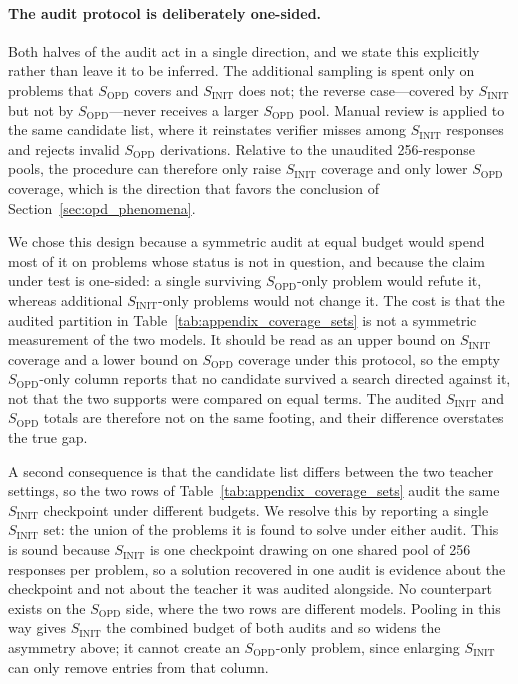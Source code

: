 \paragraph{The audit protocol is deliberately one-sided.}
Both halves of the audit act in a single direction, and we state this
explicitly rather than leave it to be inferred. The additional sampling is
spent only on problems that $S_{\mathrm{OPD}}$ covers and $S_{\mathrm{INIT}}$
does not; the reverse case---covered by $S_{\mathrm{INIT}}$ but not by
$S_{\mathrm{OPD}}$---never receives a larger $S_{\mathrm{OPD}}$ pool. Manual
review is applied to the same candidate list, where it reinstates verifier
misses among $S_{\mathrm{INIT}}$ responses and rejects invalid
$S_{\mathrm{OPD}}$ derivations. Relative to the unaudited 256-response pools,
the procedure can therefore only raise $S_{\mathrm{INIT}}$ coverage and only
lower $S_{\mathrm{OPD}}$ coverage, which is the direction that favors the
conclusion of Section~\ref{sec:opd_phenomena}.

We chose this design because a symmetric audit at equal budget would spend most
of it on problems whose status is not in question, and because the claim under
test is one-sided: a single surviving $S_{\mathrm{OPD}}$-only problem would
refute it, whereas additional $S_{\mathrm{INIT}}$-only problems would not
change it. The cost is that the audited partition in
Table~\ref{tab:appendix_coverage_sets} is not a symmetric measurement of the
two models. It should be read as an upper bound on $S_{\mathrm{INIT}}$
coverage and a lower bound on $S_{\mathrm{OPD}}$ coverage under this protocol,
so the empty $S_{\mathrm{OPD}}$-only column reports that no candidate survived
a search directed against it, not that the two supports were compared on equal
terms. The audited $S_{\mathrm{INIT}}$ and $S_{\mathrm{OPD}}$ totals are
therefore not on the same footing, and their difference overstates the true
gap.

A second consequence is that the candidate list differs between the two teacher
settings, so the two rows of Table~\ref{tab:appendix_coverage_sets} audit the
same $S_{\mathrm{INIT}}$ checkpoint under different budgets. We resolve this by
reporting a single $S_{\mathrm{INIT}}$ set: the union of the problems it is
found to solve under either audit. This is sound because $S_{\mathrm{INIT}}$ is
one checkpoint drawing on one shared pool of 256 responses per problem, so a
solution recovered in one audit is evidence about the checkpoint and not about
the teacher it was audited alongside. No counterpart exists on the
$S_{\mathrm{OPD}}$ side, where the two rows are different models. Pooling in
this way gives $S_{\mathrm{INIT}}$ the combined budget of both audits and so
widens the asymmetry above; it cannot create an $S_{\mathrm{OPD}}$-only
problem, since enlarging $S_{\mathrm{INIT}}$ can only remove entries from that
column.


